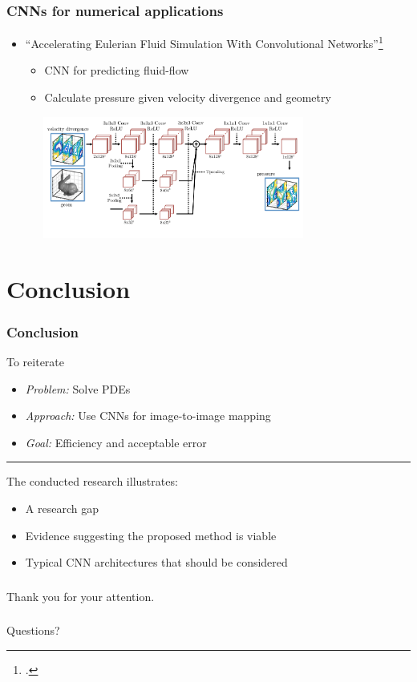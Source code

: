 \documentclass[18pt]{beamer}
\begin{document}
\begin{frame}
  \frametitle{CNNs for numerical applications}
  \begin{itemize}
  \item ``Accelerating Eulerian Fluid Simulation With Convolutional Networks''\footcite{tompson2016}
    \begin{itemize}
    \item CNN for predicting fluid-flow
    \item Calculate pressure given velocity divergence and geometry
    \end{itemize}
  \end{itemize}
  \vspace{0.1cm}
  \begin{center}
    \includegraphics[width=11cm, height=4cm]{images/sim_1}
  \end{center}
  
\end{frame}
  

\section{Conclusion}
\begin{frame}
  \frametitle{Conclusion}

  To reiterate
  \begin{itemize}
  \item \textit{Problem:} Solve PDEs 
  \item \textit{Approach:} Use CNNs for image-to-image mapping
  \item \textit{Goal:} Efficiency and acceptable error
  \end{itemize}
  
  \rule{10cm}{0.4pt}
  
  The conducted research illustrates:
  \begin{itemize}
  \item A research gap
  \item Evidence suggesting the proposed method is viable
  \item Typical CNN architectures that should be considered
  \end{itemize}  
\end{frame}


\begin{frame}
  \frametitle{}
  \begin{center}
    \huge{Thank you for your attention.}    
  \end{center}
\end{frame}

\begin{frame}
  \frametitle{}
  \begin{center}
    \huge{Questions?}
  \end{center}
\end{frame}
\end{document}
